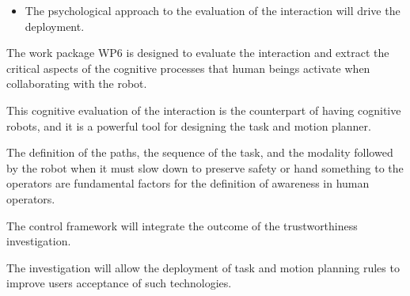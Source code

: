 \begin{itemize}[arrow]
\item
  The psychological approach to the evaluation of the interaction will
  drive the deployment.
\end{itemize}

The work package WP6 is designed to evaluate the interaction and extract
the critical aspects of the cognitive processes that human beings
activate when collaborating with the robot.

This cognitive evaluation of the interaction is the counterpart of
having cognitive robots, and it is a powerful tool for designing the
task and motion planner.

The definition of the paths, the sequence of the task, and the modality
followed by the robot when it must slow down to preserve safety or hand
something to the operators are fundamental factors for the definition of
awareness in human operators.

The control framework will integrate the outcome of the trustworthiness
investigation.

The investigation will allow the deployment of task and motion planning
rules to improve users\textquotesingle{} acceptance of such
technologies.